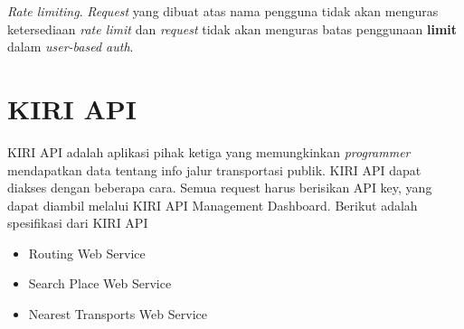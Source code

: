 \textit{Rate limiting}. \textit{Request} yang dibuat atas nama pengguna tidak akan menguras ketersediaan \textit{rate limit} dan \textit{request} tidak akan menguras batas penggunaan \textbf{limit} dalam \textit{user-based auth}.



\section{KIRI API}
KIRI API adalah aplikasi pihak ketiga yang memungkinkan \textit{programmer} mendapatkan data tentang info jalur transportasi publik. KIRI API dapat diakses dengan beberapa cara. Semua request harus berisikan API key, yang dapat diambil melalui KIRI API Management Dashboard. Berikut adalah spesifikasi dari KIRI API

\begin{itemize}
	\item Routing Web Service
	\item Search Place Web Service
	\item Nearest Transports Web Service
\end{itemize}